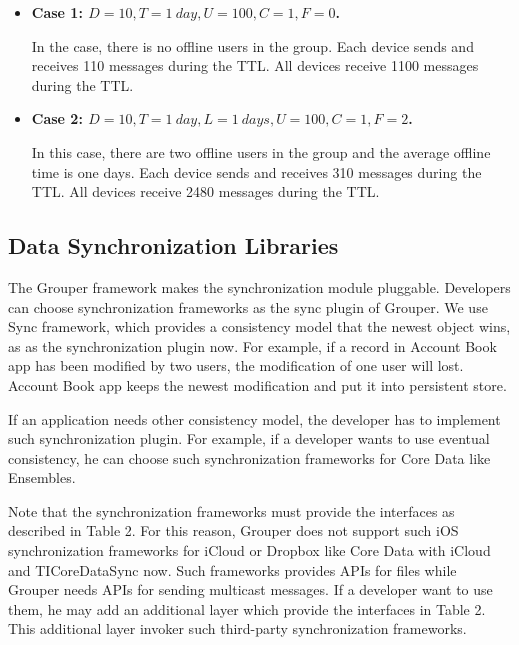 \documentclass[twocolumn,10pt]{article}
\begin{document}
 \begin{itemize}
 	\setlength{\itemsep}{1pt}
 	\setlength{\parskip}{0pt}
 	\setlength{\parsep}{0pt}
 	\item \textbf{Case 1: $D = 10, T = 1 \ day, U = 100, C = 1, F = 0$.}
 	
	In the case, there is no offline users in the group.
	Each device sends and receives 110 messages during the TTL.
	All devices receive 1100 messages during the TTL.
 	\item \textbf{Case 2: $D = 10, T = 1 \ day, L = 1 \  days, U = 100, C = 1, F = 2$.} 
 	
	In this case, there are two offline users in the group and the average offline time is one days.
	Each device sends and receives 310 messages during the TTL.
	All devices receive 2480 messages during the TTL.
\end{itemize}

\subsection{Data Synchronization Libraries}

The Grouper framework makes the synchronization module pluggable.
Developers can choose synchronization frameworks as the sync plugin of Grouper.
We use Sync\cite{sync} framework, which provides a consistency model that the newest object wins, as as the synchronization plugin now.
For example, if a record in Account Book app has been modified by two users, the modification of one user will lost.
Account Book app keeps the newest modification and put it into persistent store.

If an application needs other consistency model, the developer has to implement such synchronization plugin.
For example, if a developer wants to use eventual consistency, he can choose such synchronization frameworks for Core Data like Ensembles\cite{ensembles}.

Note that the synchronization frameworks must provide the interfaces as described in Table 2.
For this reason, Grouper does not support such iOS synchronization frameworks for iCloud or Dropbox like Core Data with iCloud\cite{coredata} and TICoreDataSync\cite{ticoredatasyn} now.
Such frameworks provides APIs for files while Grouper needs APIs for sending multicast messages.
If a developer want to use them, he may add an additional layer which provide the interfaces in Table 2.
This additional layer invoker such third-party synchronization frameworks.
\end{document}
